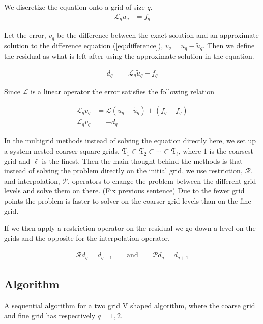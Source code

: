 		We discretize the equation onto a grid of size \(q\).
		\begin{align}
			\mathcal{L}_q u_q &= f_q \label{eq:difference}
		\end{align}

		Let the error, \(v_q\) be the difference between the exact solution and an approximate solution to the difference equation (\ref{eq:difference}), \( v_q = u_q - \tilde{u}_q \). Then we define the residual as what is left after using the approximate solution in the equation.

		\begin{align}
			d_q &= \mathcal{L}_q \tilde{u}_q - f_q
		\end{align}

		Since \(\mathcal{L}\) is a linear operator the error satisfies the following relation

		\begin{align}
			\mathcal{L}_q v_q &= \mathcal{L}(u_q - \tilde{u}_q)  + (f_q- f_q)
			\\
			\mathcal{L}_q v_q &= - d_q \label{eq:diff_MG}
		\end{align}

		In the multigrid methods instead of solving the equation directly here, we set up a system nested coarser square grids, \(\mathfrak{T}_1 \subset \mathfrak{T}_2 \subset \cdots \subset \mathfrak{T}_\ell\), where \(1\) is the coarsest grid and \(\ell\) is the finest. Then the main thought behind the methods is that instead of solving the problem directly on the initial grid, we use restriction, \( \mathcal{R} \), and interpolation, \( \mathcal{P} \), operators to change the problem between the different grid levels and solve them on there. (Fix previous sentence) Due to the fewer grid points the problem is faster to solver on the coarser grid levels than on the fine grid.

		If we then apply a restriction operator on the residual we go down a level on the grids and the opposite for the interpolation operator.

		\begin{align}
			\mathcal{R} d_q = d_{q-1} \qquad \text{and} \qquad \mathcal{P} d_q = d_{q + 1}
		\end{align}


		\subsection{Algorithm}
			A sequential algorithm for a two grid V shaped algorithm, where the coarse grid and fine grid has respectively \(q = 1,2\).

